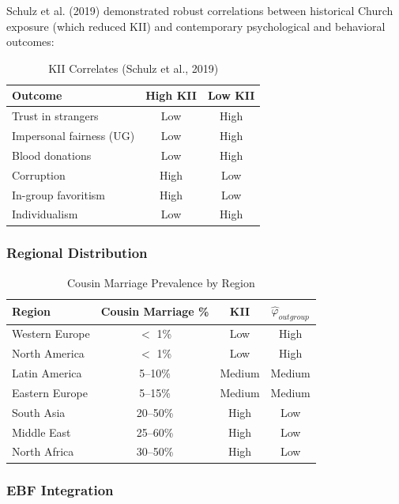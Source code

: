 Schulz et al. (2019) demonstrated robust correlations between historical Church exposure (which reduced KII) and contemporary psychological and behavioral outcomes:

\begin{table}[htbp]
\centering
\caption{KII Correlates (Schulz et al., 2019)}
\label{tab:kii-correlates}
\begin{tabular}{@{}lcc@{}}
\toprule
\textbf{Outcome} & \textbf{High KII} & \textbf{Low KII} \\
\midrule
Trust in strangers & Low & High \\
Impersonal fairness (UG) & Low & High \\
Blood donations & Low & High \\
Corruption & High & Low \\
In-group favoritism & High & Low \\
Individualism & Low & High \\
\bottomrule
\end{tabular}
\end{table}

\subsubsection{Regional Distribution}

\begin{table}[htbp]
\centering
\caption{Cousin Marriage Prevalence by Region}
\label{tab:cousin-marriage}
\begin{tabular}{@{}lccc@{}}
\toprule
\textbf{Region} & \textbf{Cousin Marriage \%} & \textbf{KII} & $\hat{\varphi}_{outgroup}$ \\
\midrule
Western Europe & $<$ 1\% & Low & High \\
North America & $<$ 1\% & Low & High \\
Latin America & 5--10\% & Medium & Medium \\
Eastern Europe & 5--15\% & Medium & Medium \\
South Asia & 20--50\% & High & Low \\
Middle East & 25--60\% & High & Low \\
North Africa & 30--50\% & High & Low \\
\bottomrule
\end{tabular}
\end{table}

\subsubsection{EBF Integration}

